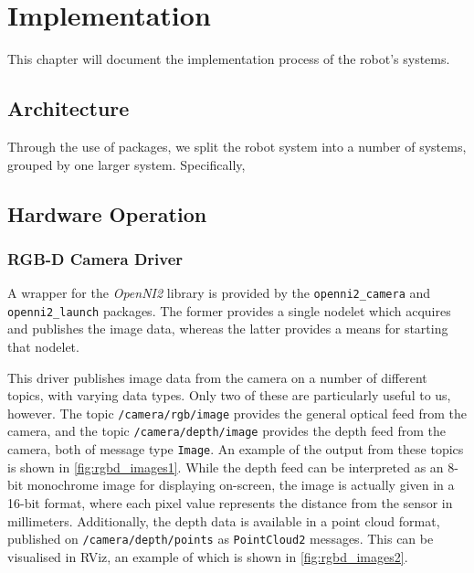 \chapter{Implementation}
\label{chap:implementation}


This chapter will document the implementation process of the robot's systems.


\section{Architecture}

Through the use of packages, we split the robot system into a number of systems, grouped by one larger system. Specifically, 


\section{Hardware Operation}

\subsection{RGB-D Camera Driver}

A wrapper for the \emph{OpenNI2} library is provided by the \texttt{openni2\_camera} \cite{ros_wiki_openni2_camera} and \texttt{openni2\_launch} \cite{ros_wiki_openni2_launch} packages. The former provides a single nodelet which acquires and publishes the image data, whereas the latter provides a means for starting that nodelet.

This driver publishes image data from the camera on a number of different topics, with varying data types. Only two of these are particularly useful to us, however. The topic \texttt{/camera/rgb/image} provides the general optical feed from the camera, and the topic \texttt{/camera/depth/image} provides the depth feed from the camera, both of message type \texttt{Image}. An example of the output from these topics is shown in \autoref{fig:rgbd_images1}. While the depth feed can be interpreted as an 8-bit monochrome image for displaying on-screen, the image is actually given in a 16-bit format, where each pixel value represents the distance from the sensor in millimeters. Additionally, the depth data is available in a point cloud format, published on \texttt{/camera/depth/points} as \texttt{PointCloud2} messages. This can be visualised in RViz, an example of which is shown in \autoref{fig:rgbd_images2}.

